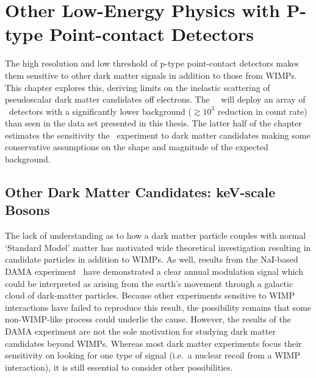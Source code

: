 \chapter{Other Low-Energy Physics with P-type Point-contact Detectors}
\label{chap:OtherPhys}

	

	The high resolution and low threshold of p-type point-contact detectors makes them sensitive to other dark matter signals in addition to those from WIMPs.  This chapter explores this, deriving limits on the inelastic scattering of pseudoscalar dark matter candidates off electrons.  The \MJ~\minmod~will deploy an array of \ppc~detectors with a significantly lower background ($\gtrsim10^{3}$ reduction in count rate) than seen in the data set presented in this thesis.  The latter half of the chapter estimates the sensitivity the \MJ~experiment to dark matter candidates making some conservative assumptions on the shape and magnitude of the expected background.  
		
	\section{Other Dark Matter Candidates: keV-scale Bosons}
	\label{sec:CalcLimitsOnHeavyAxions}		

	The lack of understanding as to how a dark matter particle couples with normal `Standard Model' matter has motivated wide theoretical investigation resulting in candidate particles in addition to WIMPs.  As well, results from the NaI-based DAMA experiment~\cite{Bernabei:2005ca} have demonstrated a clear annual modulation signal which could be interpreted as arising from the earth's movement through a galactic cloud of dark-matter particles.  Because other experiments sensitive to WIMP interactions have failed to reproduce this result, the possibility remains that some non-WIMP-like process could underlie the cause.  However, the results of the DAMA experiment are not the sole motivation for studying dark matter candidates beyond WIMPs.  Whereas most dark matter experiments focus their sensitivity on looking for one type of signal (i.e.~a nuclear recoil from a WIMP interaction), it is still essential to consider other possibilities.  
	
